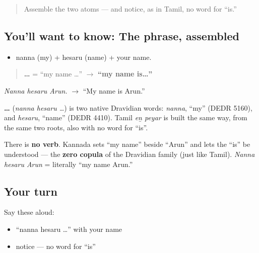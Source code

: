 \label{lesson:KA-C02-nanna-hesaru}



\begin{quote}
Assemble the two atoms — and notice, as in Tamil, no word for \textquotedblleft{}is.\textquotedblright{}
\end{quote}

\subsection*{You'll want to know: The phrase, assembled}
\begin{itemize}
\raggedright
  \item nanna (my) + hesaru (name) + your name.
\end{itemize}

\begin{quote}
\textbf{  …} = \textquotedblleft{}my name …\textquotedblright{} $\to$ \textbf{\textquotedblleft{}my name is…\textquotedblright{}}
\end{quote}

\emph{Nanna hesaru Arun.} $\to$ \textquotedblleft{}My name is Arun.\textquotedblright{}

\begin{cousinweb}
\textbf{  …} (\emph{nanna hesaru …}) is two native Dravidian words: \emph{nanna}, \textquotedblleft{}my\textquotedblright{} (DEDR 5160), and \emph{hesaru}, \textquotedblleft{}name\textquotedblright{} (DEDR 4410). Tamil \emph{eṉ peyar} is built the same way, from the same two roots, also with no word for \textquotedblleft{}is\textquotedblright{}.
\end{cousinweb}

\begin{grammarlens}[title={Grammar Lens: the zero copula}]
There is \textbf{no verb}. Kannada sets \textquotedblleft{}my name\textquotedblright{} beside \textquotedblleft{}Arun\textquotedblright{} and lets the \textquotedblleft{}is\textquotedblright{} be understood — the \textbf{zero copula} of the Dravidian family (just like Tamil). \emph{Nanna hesaru Arun} = literally \textquotedblleft{}my name Arun.\textquotedblright{}
\end{grammarlens}

\subsection*{Your turn}
Say these aloud:

\begin{itemize}
\raggedright
  \item \textquotedblleft{}nanna hesaru …\textquotedblright{} with your name
  \item notice — no word for \textquotedblleft{}is\textquotedblright{}
\end{itemize}

